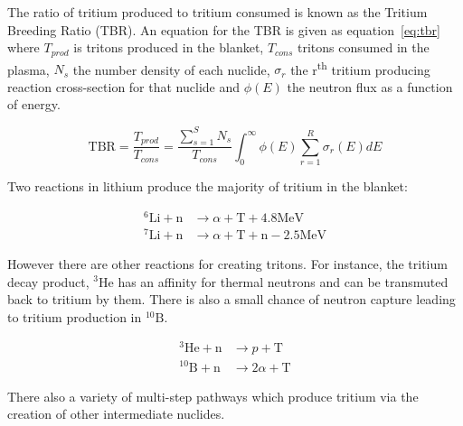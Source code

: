 The ratio of tritium produced to tritium consumed is known as the Tritium Breeding Ratio (TBR). An equation for the TBR is given as equation~\ref{eq:tbr} where $T_{prod}$ is tritons produced in the blanket, $T_{cons}$ tritons consumed in the plasma, $N_{s}$ the number density of each nuclide, $\sigma_{r}$ the r\textsuperscript{th} tritium producing reaction cross-section for that nuclide and $\phi(E)$ the neutron flux as a function of energy. 

\begin{equation}
  \label{eq:tbr}
  \mathrm{TBR} = \frac{T_{prod}}{T_{cons}} = \frac{\sum_{s=1}^{S} N_{s}}{T_{cons}} \int_{0}^{\infty} \phi(E) \sum_{r=1}^{R} \sigma_{r}(E) dE
\end{equation}

Two reactions in lithium produce the majority of tritium in the blanket:

\begin{equation}
\begin{split}
  ^{6}\mathrm{Li} + \mathrm{n} & \rightarrow \alpha + \mathrm{T} + 4.8\mathrm{MeV} \\
  ^{7}\mathrm{Li} + \mathrm{n} & \rightarrow \alpha + \mathrm{T} + \mathrm{n} - 2.5\mathrm{MeV}
\end{split}
\end{equation}

However there are other reactions for creating tritons. For instance, the tritium decay product, $^{3}\mathrm{He}$ has an affinity for thermal neutrons and can be transmuted back to tritium by them. There is also a small chance of neutron capture leading to tritium production in $^{10}\mathrm{B}$.

\begin{equation}
\begin{split}
  ^{3}\mathrm{He} + \mathrm{n} & \rightarrow p + \mathrm{T} \\
  ^{10}\mathrm{B} + \mathrm{n} & \rightarrow 2\alpha + \mathrm{T}
\end{split}
\end{equation}

There also a variety of multi-step pathways which produce tritium via the creation of other intermediate nuclides. 

